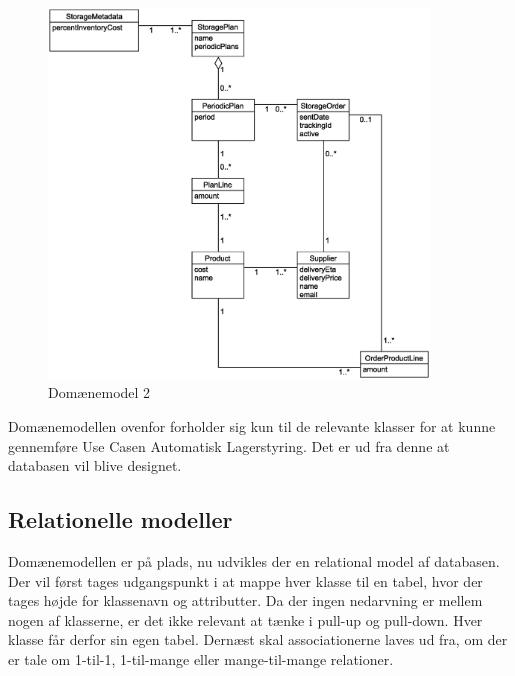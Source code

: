\begin{figure}[H]
    \centering
    \includegraphics[width=0.9\textwidth]{figures/krav/domain_model_2.eps}
    \caption{Domænemodel 2}
    \label{fig:domain_model_2}
\end{figure}

Domænemodellen ovenfor forholder sig kun til de relevante klasser for at kunne gennemføre Use Casen Automatisk Lagerstyring. Det er ud fra denne at databasen vil blive designet.

\subsection{Relationelle modeller}
Domænemodellen er på plads, nu udvikles der en relational model af databasen. Der vil først tages udgangspunkt i at mappe hver klasse til en tabel, hvor der tages højde for klassenavn og attributter.
Da der ingen nedarvning er mellem nogen af klasserne, er det ikke relevant at tænke i pull-up og pull-down. Hver klasse får derfor sin egen tabel.
Dernæst skal associationerne laves ud fra, om der er tale om 1-til-1, 1-til-mange eller mange-til-mange relationer. 


